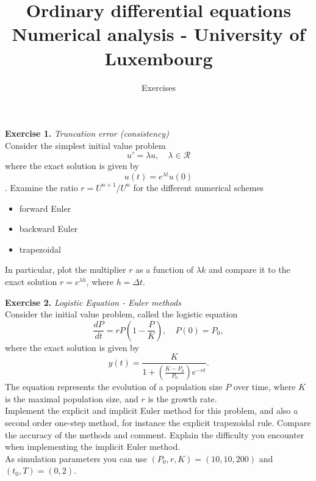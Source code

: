 \documentclass{article}
\title{Ordinary differential equations \\[1ex] \large Numerical analysis - University of Luxembourg}
\author{Exercises}
\date{}
\begin{document}
\maketitle

\vspace{0.5cm}
\noindent \textbf{Exercise 1.} \textit{Truncation error (consistency)} \\
Consider the simplest initial value problem
$$u' = \lambda u, \quad \lambda \in \mathcal{R}$$
where the exact solution is given by
$$u(t) = e^{\lambda t} u(0) $$.  
%
Examine the ratio $r = U^{n+1}/U^{n}$ for the different numerical schemes 
\begin{itemize}
\item forward Euler
\item backward Euler
\item trapezoidal
\end{itemize}
In particular, plot the multiplier $r$ as a function of $\lambda k$ and compare it to the exact solution $r = e^{\lambda h}$, where $h = \Delta t$. 
 

\vspace{0.5cm}
\noindent \textbf{Exercise 2.} \textit{Logistic Equation - Euler methods} \\
Consider the initial value problem, called the logistic equation
$$ \frac{dP}{dt} = r P \left(1- \frac{P}{K}\right), \quad P(0)= P_0, $$
where the exact solution is given by
$$y(t)=\frac{K}{ 1+ \left(\frac{K-P_0}{P_0}\right) e^{-rt}}.$$
The equation represents the evolution of a population size $P$ over time, where $K$ is the maximal population size, and $r$ is the growth rate.
\vspace{0.2cm} \\
Implement the explicit and implicit Euler method for this problem, and also a second order one-step method, for instance the explicit trapezoidal rule. Compare the accuracy of the methods and comment. Explain the difficulty you encounter when implementing the implicit Euler method. \\ 
As simulation parameters you can use $(P_0, r, K) = (10, 10, 200)$ and $(t_0, T) = (0, 2)$.
\end{document}
